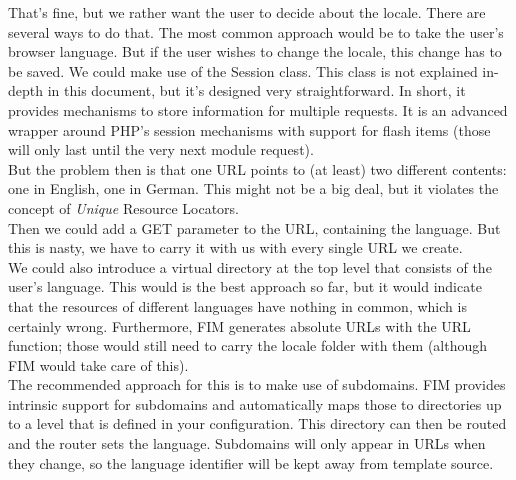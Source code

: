 \documentclass{scrartcl}
\begin{document}
      That's fine, but we rather want the user to decide about the locale. There are several ways to do that. The most common approach would be to take the user's browser language. But if the user wishes to change the locale, this change has to be saved. We could make use of the Session class. This class is not explained in-depth in this document, but it's designed very straightforward. In short, it provides mechanisms to store information for multiple requests. It is an advanced wrapper around PHP's session mechanisms with support for flash items (those will only last until the very next module request). \\
      But the problem then is that one URL points to (at least) two different contents: one in English, one in German. This might not be a big deal, but it violates the concept of \emph{Unique} Resource Locators. \\
      Then we could add a GET parameter to the URL, containing the language. But this is nasty, we have to carry it with us with every single URL we create. \\
      We could also introduce a virtual directory at the top level that consists of the user's language. This would is the best approach so far, but it would indicate that the resources of different languages have nothing in common, which is certainly wrong. Furthermore, FIM generates absolute URLs with the URL function; those would still need to carry the locale folder with them (although FIM would take care of this). \\
      The recommended approach for this is to make use of subdomains. FIM provides intrinsic support for subdomains and automatically maps those to directories up to a level that is defined in your configuration. This directory can then be routed and the router sets the language. Subdomains will only appear in URLs when they change, so the language identifier will be kept away from template source.
\end{document}
